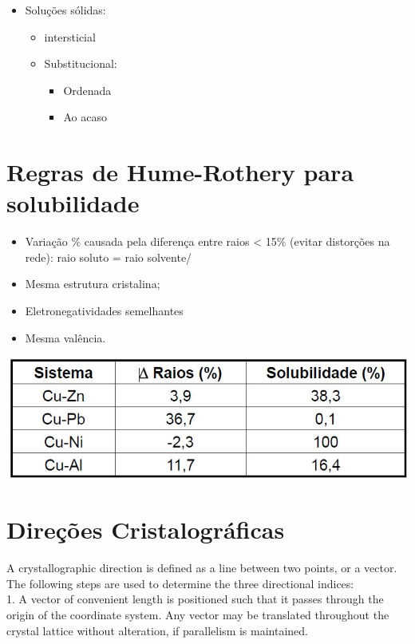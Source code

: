 \begin{itemize}
	\item Soluções sólidas:
	\begin{itemize}
		\item intersticial
		\item Substitucional:
		\begin{itemize}
			\item Ordenada
			\item Ao acaso
		\end{itemize}
	\end{itemize}
\end{itemize}

\section{Regras de Hume-Rothery para solubilidade}

\begin{itemize}
	\item Variação \% causada pela diferença entre raios < 15\% (evitar distorções na rede): raio soluto = raio solvente/
	\item Mesma estrutura cristalina;
	\item Eletronegatividades semelhantes
	\item Mesma valência.
\end{itemize}



\includegraphics[scale=0.35,trim={0 0 0 0}]{figures/hume}


\section{Direções Cristalográficas}

A crystallographic direction is defined as a line between two points, or a vector. The following steps are used to determine the three directional indices:
\\

1. A vector of convenient length is positioned such that it passes through the
origin of the coordinate system. Any vector may be translated throughout the
crystal lattice without alteration, if parallelism is maintained.
\\

